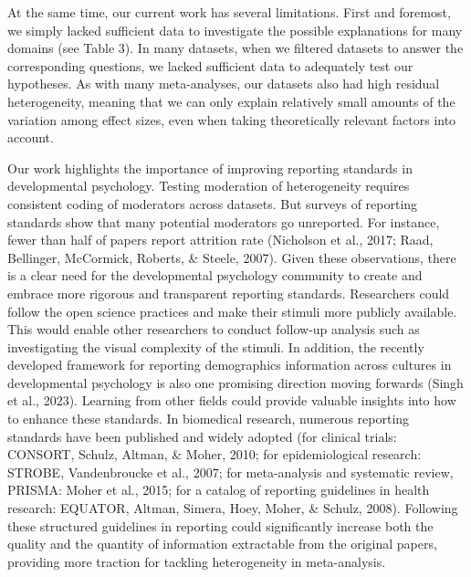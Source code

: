 \documentclass[
  man]{apa6}
\begin{document}
At the same time, our current work has several limitations. First and foremost, we simply lacked sufficient data to investigate the possible explanations for many domains (see Table 3). In many datasets, when we filtered datasets to answer the corresponding questions, we lacked sufficient data to adequately test our hypotheses. As with many meta-analyses, our datasets also had high residual heterogeneity, meaning that we can only explain relatively small amounts of the variation among effect sizes, even when taking theoretically relevant factors into account.

Our work highlights the importance of improving reporting standards in developmental psychology. Testing moderation of heterogeneity requires consistent coding of moderators across datasets. But surveys of reporting standards show that many potential moderators go unreported. For instance, fewer than half of papers report attrition rate (Nicholson et al., 2017; Raad, Bellinger, McCormick, Roberts, \& Steele, 2007). Given these observations, there is a clear need for the developmental psychology community to create and embrace more rigorous and transparent reporting standards. Researchers could follow the open science practices and make their stimuli more publicly available. This would enable other researchers to conduct follow-up analysis such as investigating the visual complexity of the stimuli. In addition, the recently developed framework for reporting demographics information across cultures in developmental psychology is also one promising direction moving forwards (Singh et al., 2023). Learning from other fields could provide valuable insights into how to enhance these standards. In biomedical research, numerous reporting standards have been published and widely adopted (for clinical trials: CONSORT, Schulz, Altman, \& Moher, 2010; for epidemiological research: STROBE, Vandenbroucke et al., 2007; for meta-analysis and systematic review, PRISMA: Moher et al., 2015; for a catalog of reporting guidelines in health research: EQUATOR, Altman, Simera, Hoey, Moher, \& Schulz, 2008). Following these structured guidelines in reporting could significantly increase both the quality and the quantity of information extractable from the original papers, providing more traction for tackling heterogeneity in meta-analysis.
\end{document}
